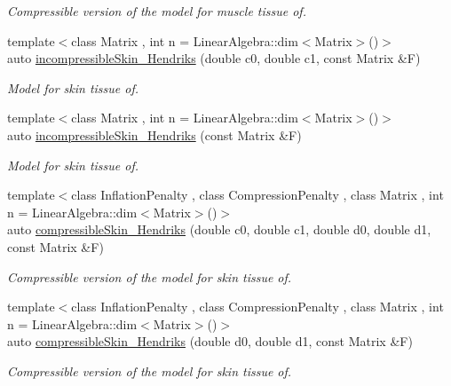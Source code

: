 \begin{DoxyCompactItemize}
\begin{DoxyCompactList}\small\item\em \-Compressible version of the model for muscle tissue of. \end{DoxyCompactList}\item 
{\footnotesize template$<$class Matrix , int n = \-Linear\-Algebra\-::dim$<$\-Matrix$>$()$>$ }\\auto \hyperlink{group__Biomechanics_gaa20bf15ef6976d64d89490429035b2c4}{incompressible\-Skin\-\_\-\-Hendriks} (double c0, double c1, const \-Matrix \&\-F)
\begin{DoxyCompactList}\small\item\em \-Model for skin tissue of. \end{DoxyCompactList}\item 
{\footnotesize template$<$class Matrix , int n = \-Linear\-Algebra\-::dim$<$\-Matrix$>$()$>$ }\\auto \hyperlink{group__Biomechanics_gad8653218bd2afb4e3cfd601a5142956c}{incompressible\-Skin\-\_\-\-Hendriks} (const \-Matrix \&\-F)
\begin{DoxyCompactList}\small\item\em \-Model for skin tissue of. \end{DoxyCompactList}\item 
{\footnotesize template$<$class Inflation\-Penalty , class Compression\-Penalty , class Matrix , int n = \-Linear\-Algebra\-::dim$<$\-Matrix$>$()$>$ }\\auto \hyperlink{group__Biomechanics_ga07b4c52c6ecf7e72f73ab5832fb262cd}{compressible\-Skin\-\_\-\-Hendriks} (double c0, double c1, double d0, double d1, const \-Matrix \&\-F)
\begin{DoxyCompactList}\small\item\em \-Compressible version of the model for skin tissue of. \end{DoxyCompactList}\item 
{\footnotesize template$<$class Inflation\-Penalty , class Compression\-Penalty , class Matrix , int n = \-Linear\-Algebra\-::dim$<$\-Matrix$>$()$>$ }\\auto \hyperlink{group__Biomechanics_ga42721e772b7eada1b0bca98247ad440f}{compressible\-Skin\-\_\-\-Hendriks} (double d0, double d1, const \-Matrix \&\-F)
\begin{DoxyCompactList}\small\item\em \-Compressible version of the model for skin tissue of. \end{DoxyCompactList}\item 

\end{DoxyCompactItemize}
